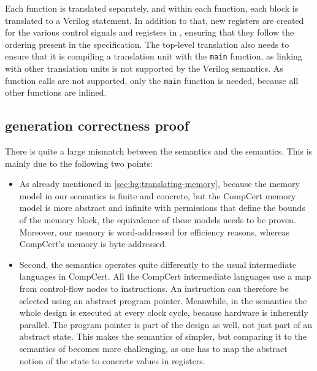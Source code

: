 Each \rtlsubpar{} function is translated separately, and within each function,
each block is translated to a Verilog statement.  In addition to that, new
registers are created for the various control signals and registers in \htl{},
ensuring that they follow the ordering present in the \htl{} specification.  The
top-level translation also needs to ensure that it is compiling a translation
unit with the \texttt{main} function, as linking with other translation units is
not supported by the Verilog semantics.  As function calls are not supported,
only the \texttt{main} function is needed, because all other functions are
inlined.

\subsection{\htl{} generation correctness proof}%
\label{sec:hg:htl-generation-correctness-proof}

There is quite a large mismatch between the \htl{} semantics and the
\rtlsubpar{} semantics.  This is mainly due to the following two points:

\begin{itemize}
\item As already mentioned in \cref{sec:hg:translating-memory}, because the
  memory model in our \htl{} semantics is finite and concrete, but the CompCert
  memory model is more abstract and infinite with permissions that define the
  bounds of the memory block, the equivalence of these models needs to be
  proven.  Moreover, our memory is word-addressed for efficiency reasons,
  whereas CompCert's memory is byte-addressed.

\item Second, the \htl{} semantics operates quite differently to the usual
  intermediate languages in CompCert.  All the CompCert intermediate languages
  use a map from control-flow nodes to instructions.  An instruction can
  therefore be selected using an abstract program pointer. Meanwhile, in the
  \htl{} semantics the whole design is executed at every clock cycle, because
  hardware is inherently parallel. The program pointer is part of the design as
  well, not just part of an abstract state. This makes the semantics of \htl{}
  simpler, but comparing it to the semantics of \rtl{} becomes more challenging,
  as one has to map the abstract notion of the state to concrete values in
  registers.
\end{itemize}


